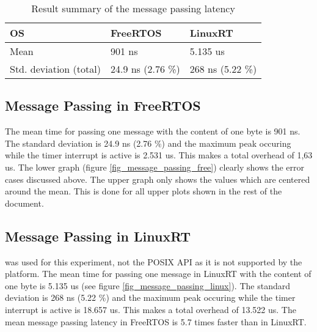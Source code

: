 \begin{table}[htbp!]
	\centering
		\begin{tabular}{|l||l|l|}
			\hline
				OS 											& FreeRTOS	& LinuxRT  \\
				\hline 
				Mean  										& 901 ns		& 5.135 us  \\
			  \hline
			  Std. deviation (total)	  & 24.9 ns (2.76 \%)		& 268 ns (5.22 \%)		  \\
			\hline
		\end{tabular}
	\caption{Result summary of the message passing latency}
	\label{tab_summary_message_passing}
\end{table}

\subsection{Message Passing in FreeRTOS}
The mean time for passing one message with the content of one byte is 901 ns. 
The standard deviation is 24.9 ns (2.76 \%) and the maximum peak occuring while the timer interrupt is active is 2.531 us.
This makes a total overhead of 1,63 us. 
The lower graph (figure \ref{fig_message_passing_free}) clearly shows the error cases discussed above. 
The upper graph only shows the values which are centered around the mean. 
This is done for all upper plots shown in the rest of the document. 

\subsection{Message Passing in LinuxRT}
 was used for this experiment, not the POSIX \ac{API} as it is not supported by the platform.
The mean time for passing one message in LinuxRT with the content of one byte is 5.135 us (see figure \ref{fig_message_passing_linux}). 
The standard deviation is 268 ns (5.22 \%) and the maximum peak occuring while the timer interrupt is active is 18.657 us.
This makes a total overhead of 13.522 us. 
The mean message passing latency in FreeRTOS is 5.7 times faster than in LinuxRT.

